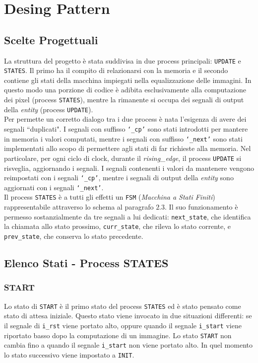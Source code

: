 \documentclass[11pt, a4paper]{article}
\begin{document}
\section{Desing Pattern}
\subsection{Scelte Progettuali}
La struttura del progetto è stata suddivisa in due process principali: \texttt{UPDATE} e \texttt{STATES}.
Il primo ha il compito di relazionarsi con la memoria e il secondo contiene gli stati della macchina impiegati nella equalizzazione delle immagini. In questo modo una porzione di codice è adibita esclusivamente alla computazione dei pixel (process \texttt{STATES}), mentre la rimanente si occupa dei segnali di output della \textit{entity} (process \texttt{UPDATE}).\\
Per permette un corretto dialogo tra i due process è nata l'esigenza di avere dei segnali ``duplicati".
I segnali con suffisso \texttt{\lq\_cp'} sono stati introdotti per mantere in memoria i valori computati, mentre i segnali con suffisso \texttt{\lq\_next'} sono stati implementati allo scopo di permettere agli stati di far richieste alla memoria.
Nel particolare, per ogni ciclo di clock, durante il \textit{rising\_edge}, il process \texttt{UPDATE} si risveglia, aggiornando i segnali. I segnali contenenti i valori da mantenere vengono reimpostati con i segnali \texttt{\lq\_cp'}, mentre i segnali di output della \textit{entity} sono aggiornati con i segnali \texttt{\lq\_next'}.\\
Il process \texttt{STATES} è a tutti gli effetti un \texttt{FSM} (\textit{Macchina a Stati Finiti}) rappresentabile attraverso lo schema al paragrafo $2.3$.
Il suo funzionamento è permesso sostanzialmente da tre segnali a lui dedicati: \texttt{next\_state}, che identifica la chiamata allo stato prossimo,  \texttt{curr\_state}, che rileva lo stato corrente, e \texttt{prev\_state}, che conserva lo stato precedente.

\subsection{Elenco Stati - Process STATES}

\subsubsection{START}
Lo stato di \texttt{START} è il primo stato del process \texttt{STATES} ed è stato pensato come stato di attesa iniziale. Questo stato viene invocato in due situazioni differenti: se il segnale di \texttt{i\_rst} viene portato alto, oppure quando il segnale \texttt{i\_start} viene riportato basso dopo la computazione di un immagine. Lo stato \texttt{START} non cambia fino a quando il segnale \texttt{i\_start} non viene portato alto. In quel momento lo stato successivo viene impostato a \texttt{INIT}.
\end{document}
